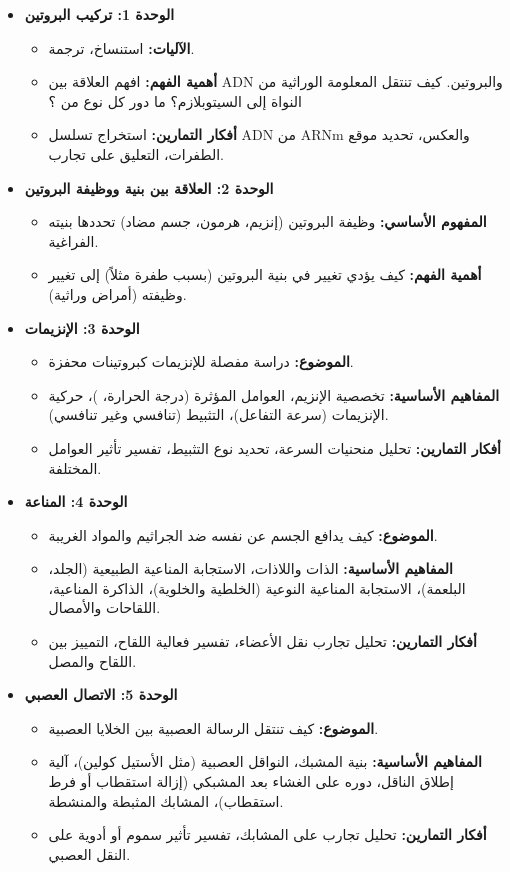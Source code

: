 \documentclass[12pt,a4paper]{book}
\begin{document}
	\begin{itemize}
		\item \textbf{الوحدة 1: تركيب البروتين}
		\begin{itemize}
			\item \textbf{الآليات:} استنساخ، ترجمة.
			\item \textbf{أهمية الفهم:} افهم العلاقة بين ADN والبروتين. كيف تنتقل المعلومة الوراثية من النواة إلى السيتوبلازم؟ ما دور كل نوع من ؟
			\item \textbf{أفكار التمارين:} استخراج تسلسل ADN من ARNm والعكس، تحديد موقع الطفرات، التعليق على تجارب.
		\end{itemize}
		\item \textbf{الوحدة 2: العلاقة بين بنية ووظيفة البروتين}
		\begin{itemize}
			\item \textbf{المفهوم الأساسي:} وظيفة البروتين (إنزيم، هرمون، جسم مضاد) تحددها بنيته الفراغية.
			\item \textbf{أهمية الفهم:} كيف يؤدي تغيير في بنية البروتين (بسبب طفرة مثلاً) إلى تغيير وظيفته (أمراض وراثية).
		\end{itemize}
		\item \textbf{الوحدة 3: الإنزيمات}
		\begin{itemize}
			\item \textbf{الموضوع:} دراسة مفصلة للإنزيمات كبروتينات محفزة.
			\item \textbf{المفاهيم الأساسية:} تخصصية الإنزيم، العوامل المؤثرة (درجة الحرارة، )، حركية الإنزيمات (سرعة التفاعل)، التثبيط (تنافسي وغير تنافسي).
			\item \textbf{أفكار التمارين:} تحليل منحنيات السرعة، تحديد نوع التثبيط، تفسير تأثير العوامل المختلفة.
		\end{itemize}
		\item \textbf{الوحدة 4: المناعة}
		\begin{itemize}
			\item \textbf{الموضوع:} كيف يدافع الجسم عن نفسه ضد الجراثيم والمواد الغريبة.
			\item \textbf{المفاهيم الأساسية:} الذات واللاذات، الاستجابة المناعية الطبيعية (الجلد، البلعمة)، الاستجابة المناعية النوعية (الخلطية والخلوية)، الذاكرة المناعية، اللقاحات والأمصال.
			\item \textbf{أفكار التمارين:} تحليل تجارب نقل الأعضاء، تفسير فعالية اللقاح، التمييز بين اللقاح والمصل.
		\end{itemize}
		\item \textbf{الوحدة 5: الاتصال العصبي}
		\begin{itemize}
			\item \textbf{الموضوع:} كيف تنتقل الرسالة العصبية بين الخلايا العصبية.
			\item \textbf{المفاهيم الأساسية:} بنية المشبك، النواقل العصبية (مثل الأستيل كولين)، آلية إطلاق الناقل، دوره على الغشاء بعد المشبكي (إزالة استقطاب أو فرط استقطاب)، المشابك المثبطة والمنشطة.
			\item \textbf{أفكار التمارين:} تحليل تجارب على المشابك، تفسير تأثير سموم أو أدوية على النقل العصبي.
		\end{itemize}
	\end{itemize}
	
\end{document}

